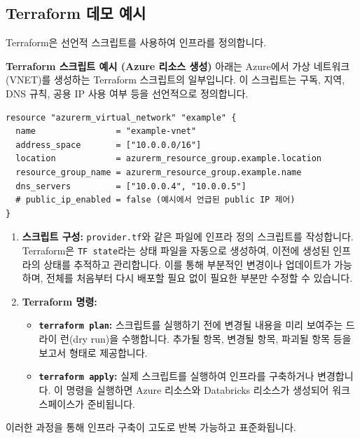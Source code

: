 \documentclass[11pt,a4paper]{article}
\theoremstyle{definition}
\begin{document}
\subsection{Terraform 데모 예시}
Terraform은 선언적 스크립트를 사용하여 인프라를 정의합니다.

\begin{examplebox} %
\textbf{Terraform 스크립트 예시 (Azure 리소스 생성)}
아래는 Azure에서 가상 네트워크(VNET)를 생성하는 Terraform 스크립트의 일부입니다. 이 스크립트는 구독, 지역, DNS 규칙, 공용 IP 사용 여부 등을 선언적으로 정의합니다.

\begin{lstlisting}[language=HCL, caption={Terraform Azure VNET 생성 예시}, label={lst:terraform_azure_vnet}]
resource "azurerm_virtual_network" "example" {
  name                = "example-vnet"
  address_space       = ["10.0.0.0/16"]
  location            = azurerm_resource_group.example.location
  resource_group_name = azurerm_resource_group.example.name
  dns_servers         = ["10.0.0.4", "10.0.0.5"]
  # public_ip_enabled = false (예시에서 언급된 public IP 제어)
}
\end{lstlisting}
\end{examplebox}

\begin{enumerate}
    \item \textbf{스크립트 구성:}
    \texttt{provider.tf}와 같은 파일에 인프라 정의 스크립트를 작성합니다. Terraform은 \texttt{TF state}라는 상태 파일을 자동으로 생성하여, 이전에 생성된 인프라의 상태를 추적하고 관리합니다. 이를 통해 부분적인 변경이나 업데이트가 가능하며, 전체를 처음부터 다시 배포할 필요 없이 필요한 부분만 수정할 수 있습니다.

    \item \textbf{Terraform 명령:}
    \begin{itemize}
        \item \textbf{\texttt{terraform plan}:} 스크립트를 실행하기 전에 변경될 내용을 미리 보여주는 드라이 런(dry run)을 수행합니다. 추가될 항목, 변경될 항목, 파괴될 항목 등을 보고서 형태로 제공합니다.
        \item \textbf{\texttt{terraform apply}:} 실제 스크립트를 실행하여 인프라를 구축하거나 변경합니다. 이 명령을 실행하면 Azure 리소스와 Databricks 리소스가 생성되어 워크스페이스가 준비됩니다.
    \end{itemize}
\end{enumerate}
이러한 과정을 통해 인프라 구축이 고도로 반복 가능하고 표준화됩니다.
\end{document}
